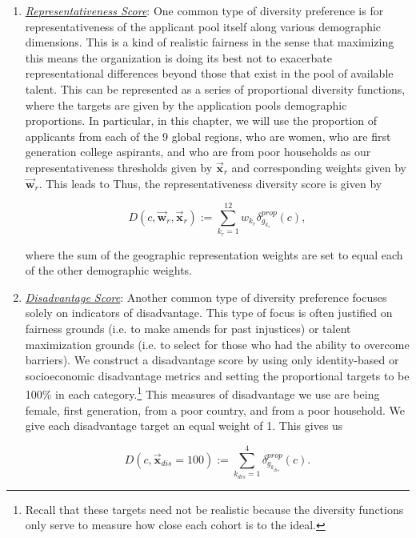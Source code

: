 \begin{enumerate}
\item \underline{\emph{Representativeness Score}}: One common type of diversity preference is for representativeness of the applicant pool itself along various demographic dimensions. This is a kind of realistic fairness in the sense that maximizing this means the organization is doing its best not to exacerbate representational differences beyond those that exist in the pool of available talent. This can be represented as a series of proportional diversity functions, where the targets are given by the application pools demographic proportions. In particular, in this chapter, we will use the proportion of applicants from each of the 9 global regions, who are women, who are first generation college aspirants, and who are from poor households as our representativeness thresholds given by $\vec{\mathbf{x}}_{r}$ and corresponding weights given by $\vec{\mathbf{w}}_{r}$. This leads to Thus, the representativeness diversity score is given by 

\begin{equation}
D(c,\vec{\mathbf{w}}_r, \vec{\mathbf{x}}_r) := \sum_{k_r = 1}^{12}w_{k_r}\delta_{g_{k_r}}^{prop}(c),
\end{equation}

\noindent where the sum of the geographic representation weights are set to equal each of the other demographic weights. 

\item \underline{\emph{Disadvantage Score}}: Another common type of diversity preference focuses solely on indicators of disadvantage. This type of focus is often justified on fairness grounds (i.e. to make amends for past injustices) or talent maximization grounds (i.e. to select for those who had the ability to overcome barriers). We construct a disadvantage score by using only identity-based or socioeconomic disadvantage metrics and setting the proportional targets to be 100\% in each category.\footnote{Recall that these targets need not be realistic because the diversity functions only serve to measure how close each cohort is to the ideal.} This measures of disadvantage we use are being female, first generation, from a poor country, and from a poor household. We give each disadvantage target an equal weight of 1. This gives us 

\begin{equation}
D(c,\vec{\mathbf{x}}_{dis} = 100) := \sum_{k_{dis} = 1}^{4}\delta_{g_{k_{dis}}}^{prop}(c).
\end{equation}


\end{enumerate}

